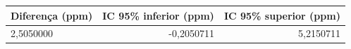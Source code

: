 \begin{tabular}{lrr}
\toprule
Diferença (ppm) & IC 95\% inferior (ppm) & IC 95\% superior (ppm) \\
\midrule
2,5050000 & -0,2050711 & 5,2150711 \\
\bottomrule
\end{tabular}
